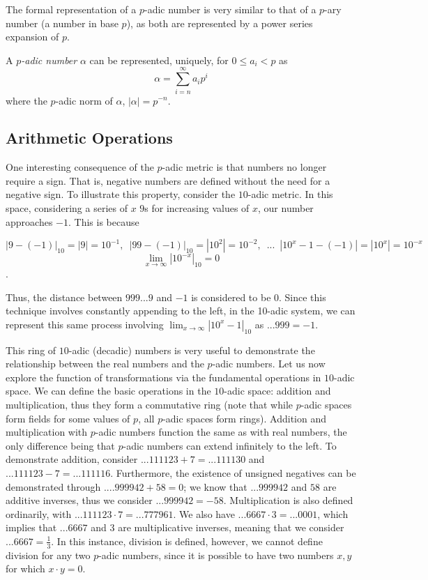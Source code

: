 \documentclass[a4paper]{article}
\begin{document}
The formal representation of a $p$-adic number is very similar to that of a $p$-ary number (a number in base $p$), as both are represented by a power series expansion of $p$. 

\begin{definition}{}
A \textit{$p$-adic number} $\alpha$ can be represented, uniquely, for $ 0 \leq a_i < p$ as
\[\alpha = \sum_{i=n}^{\infty}a_i p^{i}\]
where the $p$-adic norm of $\alpha$, $|\alpha|=p^{-n}$.

\end{definition}

\subsection{Arithmetic Operations}

One interesting consequence of the $p$-adic metric is that numbers no longer require a sign. That is, negative numbers are defined without the need for a negative sign. To illustrate this property, consider the $10$-adic metric. In this space, considering a series of $x$ $9$s for increasing values of $x$, our number approaches $-1$. This is because 

\[|9-(-1)|_{10} =|9| = 10^{-1}, \,\,\,|99-(-1)|_{10} = |10^2| = 10^{-2},\,\,\,...\,\,\,|10^{x}-1-(-1)|=|10^x|=10^{-x}\] \[\lim_{x\to\infty}|10^{-x}|_{10} = 0\].

Thus, the distance between $999...9$ and $-1$ is considered to be $0$. Since this technique involves constantly appending to the left, in the 10-adic system, we can represent this same process involving $\lim_{x\to\infty}|10^{x}-1|_{10}$ as $...999=-1$.

This ring of $10$-adic (decadic) numbers is very useful to demonstrate the relationship between the real numbers and the $p$-adic numbers. Let us now explore the function of transformations via the fundamental operations in $10$-adic space. We can define the  basic operations in the $10$-adic space: addition and multiplication, thus they form a commutative ring (note that while $p$-adic spaces form fields for some values of $p$, all $p$-adic spaces form rings). Addition and multiplication with $p$-adic numbers function the same as with real numbers, the only difference being that $p$-adic numbers can extend infinitely to the left. To demonstrate addition, consider $...111123 + 7 = ...111130 $ and $...111123 - 7 = ...111116 $. Furthermore, the existence of unsigned negatives can be demonstrated through $....999942 + 58 = 0$; we know that $...999942$ and $58$ are additive inverses, thus we consider $...999942 = -58$. Multiplication is also defined ordinarily, with $...111123 \cdot 7 = ...777961 $. We also have $...6667 \cdot 3 = ...0001$, which implies that $...6667$ and $3$ are multiplicative inverses, meaning that we consider $...6667 = \frac{1}{3}$. In this instance, division is defined, however, we cannot define division for any two $p$-adic numbers, since it is possible to have  two numbers $x, y$ for which $x \cdot y = 0$. 
\end{document}
